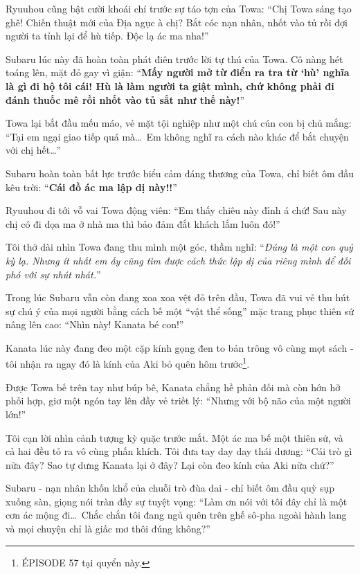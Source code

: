 \documentclass[../main.tex]{subfiles}
\begin{document}
Ryuuhou cũng bật cười khoái chí trước sự táo tợn của Towa: ``Chị Towa sáng tạo ghê! Chiến thuật mới của Địa ngục à chị? Bắt cóc nạn nhân, nhốt vào tủ rồi đợi người ta tỉnh lại để hù tiếp. Độc lạ ác ma nha!''

Subaru lúc này đã hoàn toàn phát điên trước lời tự thú của Towa. Cô nàng hét toáng lên, mặt đỏ gay vì giận: ``\textbf{Mấy người mở từ điển ra tra từ `hù' nghĩa là gì đi hộ tôi cái! Hù là làm người ta giật mình, chứ không phải đi đánh thuốc mê rồi nhốt vào tủ sắt như thế này!}''

Towa lại bắt đầu mếu máo, vẻ mặt tội nghiệp như một chú cún con bị chủ mắng: ``Tại em ngại giao tiếp quá mà\dots\ Em không nghĩ ra cách nào khác để bắt chuyện với chị hết\dots''

Subaru hoàn toàn bất lực trước biểu cảm đáng thương của Towa, chỉ biết ôm đầu kêu trời: ``\textbf{Cái đồ ác ma lập dị này!!}''

Ryuuhou đi tới vỗ vai Towa động viên: ``Em thấy chiêu này đỉnh á chứ! Sau này chị có đi dọa ma ở nhà ma thì bảo đảm đắt khách lắm luôn đó!''

Tôi thở dài nhìn Towa đang thu mình một góc, thầm nghĩ: ``\textit{Đúng là một con quỷ kỳ lạ. Nhưng ít nhất em ấy cũng tìm được cách thức lập dị của riêng mình để đối phó với sự nhút nhát.}''

Trong lúc Subaru vẫn còn đang xoa xoa vệt đỏ trên đầu, Towa đã vui vẻ thu hút sự chú ý của mọi người bằng cách bế một ``vật thể sống'' mặc trang phục thiên sứ nâng lên cao: ``Nhìn này! Kanata bé con!''

Kanata lúc này đang đeo một cặp kính gọng đen to bản trông vô cùng mọt sách - tôi nhận ra ngay đó là kính của Aki bỏ quên hôm trước\footnote{{\flaregothic ÉPISODE 57} tại quyển này.}.

Được Towa bế trên tay như búp bê, Kanata chẳng hề phản đối mà còn hớn hở phối hợp, giơ một ngón tay lên đầy vẻ triết lý: ``Nhưng với bộ não của một người lớn!''


Tôi cạn lời nhìn cảnh tượng kỳ quặc trước mắt. Một ác ma bế một thiên sứ, và cả hai đều tỏ ra vô cùng phấn khích. Tôi đưa tay day day thái dương: ``Cái trò gì nữa đây? Sao tự dưng Kanata lại ở đây? Lại còn đeo kính của Aki nữa chứ?''

Subaru - nạn nhân khốn khổ của chuỗi trò đùa dai - chỉ biết ôm đầu quỳ sụp xuống sàn, giọng nói tràn đầy sự tuyệt vọng: ``Làm ơn nói với tôi đây chỉ là một cơn ác mộng đi\dots\ Chắc chắn tôi đang ngủ quên trên ghế sô-pha ngoài hành lang và mọi chuyện chỉ là giấc mơ thôi đúng không?''
\end{document}
